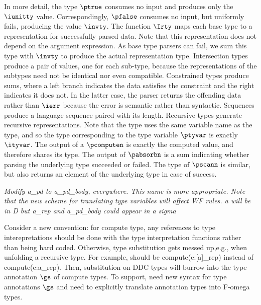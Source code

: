 In more detail,
the \ddc{} type $\ptrue$ consumes no input and produces only
the $\iunitty$ value.  Correspondingly, $\pfalse$ consumes no input,
but uniformly fails, producing the value $\invty$. The
function $\Irty$ maps each base type to a representation for
successfully parsed data. Note that this representation does not depend
on the argument expression. As base type parsers can fail, we sum this type
with $\invty$ to produce the actual representation type.
Intersection types produce a pair of values, one for each sub-type,
because the representations of the subtypes need not be identical nor
even compatible. 
Constrained types produce sums, where a left branch indicates the data
satisfies the constraint and the right indicates it does not. In
the latter case, the parser returns the offending data rather than
$\ierr$ because the error is semantic rather than syntactic.
Sequences produce a \implang{} language sequence paired with its
length.  Recursive types generate recursive representations. Note that the \implang{} type uses the same variable name
as the \ddc{} type, and so the type corresponding to the type variable
$\ptyvar$ is exactly $\ityvar$.
The output of a $\pcomputen$ is exactly the computed value, and
therefore shares its type.  The output of $\pabsorbn$ is a sum
indicating whether parsing the underlying type succeeded or failed.
The type of $\pscann$ is similar, but also returns an element of the
underlying type in case of success.

{\em Modify a\_pd to a\_pd\_body, everywhere. This name is more
  appropriate.  Note that the new scheme for translating type
  variables will affect WF rules. a will be in D but a\_rep and
  a\_pd\_body could appear in a sigma

  Consider a new convention: for compute type, any references to type
  interepretations should be done with the type interpretation
  functions rather than being hard coded. Otherwise, type substitution gets
  messed up,e.g., when unfolding a recursive type. 
  For example, should be compute(e:[a]\_rep) instead of
  compute(e:a\_rep). Then, substitution on DDC types will burrow into
  the type annotation $\gs$ of compute types. To support, need new
  syntax for type annotations $\gs$ and need to explicitly translate
  annotation types into F-omega types.
  
}

